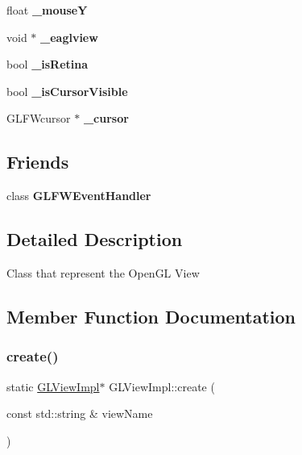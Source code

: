 \begin{DoxyCompactItemize}
\mbox{\label{classGLViewImpl_af0c167ac30fcc9bd36d2621fe7778a6e}} 
float {\bfseries \+\_\+mouseY}
\item 
\mbox{\label{classGLViewImpl_ad8f4c7e7444d7d74a77f6e9b2e73d46c}} 
void $\ast$ {\bfseries \+\_\+eaglview}
\item 
\mbox{\label{classGLViewImpl_adc7037a7b565d836f5a66a792ec086df}} 
bool {\bfseries \+\_\+is\+Retina}
\item 
\mbox{\label{classGLViewImpl_ab53fbfe80b5176d30b17285f066ef91f}} 
bool {\bfseries \+\_\+is\+Cursor\+Visible}
\item 
\mbox{\label{classGLViewImpl_aa624d1d0c8044aab880946d877bc3f3f}} 
G\+L\+F\+Wcursor $\ast$ {\bfseries \+\_\+cursor}
\end{DoxyCompactItemize}
\subsection*{Friends}
\begin{DoxyCompactItemize}
\item 
\mbox{\label{classGLViewImpl_ab4e4a91fb2fcc59359faf85ded99c76d}} 
class {\bfseries G\+L\+F\+W\+Event\+Handler}
\end{DoxyCompactItemize}


\subsection{Detailed Description}
Class that represent the Open\+GL View 

\subsection{Member Function Documentation}
\mbox{\label{classGLViewImpl_a6e699d7e719e91833b93dcfffca4d081}} 
\subsubsection{\texorpdfstring{create()}{create()}\hspace{0.1cm}{\footnotesize\ttfamily [1/2]}}
{\footnotesize\ttfamily static \hyperlink{classGLViewImpl}{G\+L\+View\+Impl}$\ast$ G\+L\+View\+Impl\+::create (\begin{DoxyParamCaption}\item[{const std\+::string \&}]{view\+Name }\end{DoxyParamCaption})\hspace{0.3cm}{\ttfamily [static]}}

